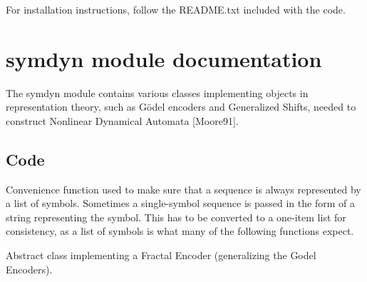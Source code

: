 \documentclass[letterpaper,10pt,english]{sphinxmanual}
\begin{document}
For installation instructions, follow the README.txt included with the
code.


\chapter{symdyn module documentation}
\label{symdyn_docs::doc}\label{symdyn_docs:symdyn-module-documentation}
The symdyn module contains various classes implementing objects in representation theory, such as Gödel encoders and Generalized Shifts, needed to construct Nonlinear Dynamical Automata  {[}Moore91{]}.


\section{Code}
\label{symdyn_docs:code}\label{symdyn_docs:module-symdyn}

\begin{fulllineitems}
\label{symdyn_docs:symdyn.as_list}
Convenience function used to make sure that a sequence is always
represented by a list of symbols. Sometimes a single-symbol
sequence is passed in the form of a string representing the
symbol. This has to be converted to a one-item list for
consistency, as a list of symbols is what many of the following
functions expect.

\end{fulllineitems}


\begin{fulllineitems}
\label{symdyn_docs:symdyn.FractalEncoder}
Abstract class implementing a Fractal Encoder (generalizing the
Godel Encoders).

\end{fulllineitems}

\end{document}

